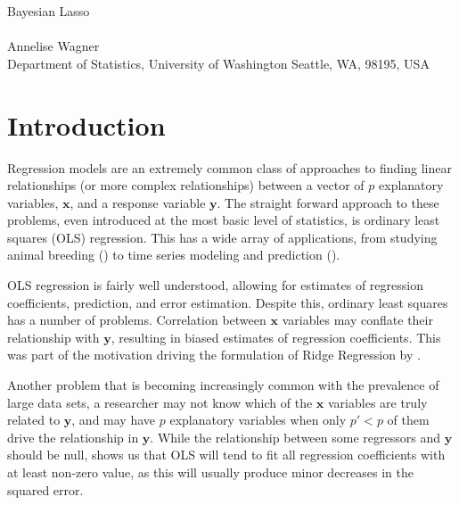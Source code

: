 \documentclass{uwstat572}
\newcommand{\vmdel}[1]{\sout{#1}}
\newcommand{\vmadd}[1]{\textbf{\color{red}{#1}}}
\begin{document}

\begin{center}
  {\LARGE Bayesian Lasso}\\\ \\
  {Annelise Wagner \\ 
    Department of Statistics, University of Washington Seattle, WA, 98195, USA
  }
\end{center}

\begin{abstract}
  The Bayesian Lasso, building on the interpretation of Tibshirani, places Laplace priors on linear regression coefficients to allow for Bayesian approaches to parameter and error estimation. Taking advantage of a scale mixture of normals re-expression for the Laplacian distribution allows for easy sampling from full conditionals which in turn culminate in a simple Gibbs sampler to produce credible intervals \vmdel{on estimated} \vmadd{for regression} coefficients.
\end{abstract}

\section{Introduction}\label{Introduction}
Regression models are an extremely common class of approaches to finding linear relationships (or more complex relationships) between a vector of $p$ explanatory variables, $\mathbf{x}$, and a response variable $\mathbf{y}$. The straight forward approach to these problems, even introduced at the most basic level of statistics, is ordinary least squares (OLS) regression. This has a wide array of applications, from studying animal breeding (\cite{mrode2014linear}) to time series modeling and prediction (\cite{brockwell1991time}).

OLS regression is fairly well understood, allowing for estimates of regression coefficients, prediction, and error estimation. Despite this, ordinary least squares has a number of problems. Correlation between $\mathbf{x}$ variables may conflate their relationship with $\mathbf{y}$, resulting in biased estimates of regression coefficients. This was part of the motivation driving the formulation of Ridge Regression by \cite{hoerl1970ridge}.

Another problem that is becoming increasingly common with the prevalence of large data sets, a researcher may not know which of the $\mathbf{x}$ variables are truly related to $\mathbf{y}$, and may have $p$ explanatory variables when only $p'<p$ of them drive the relationship in $\mathbf{y}$. While the relationship between some regressors and $\mathbf{y}$ should be null, \cite{seeger2008bayesian} shows us that OLS will tend to fit all regression coefficients with at least non-zero value, as this will usually produce minor decreases in the squared error.
\end{document}
